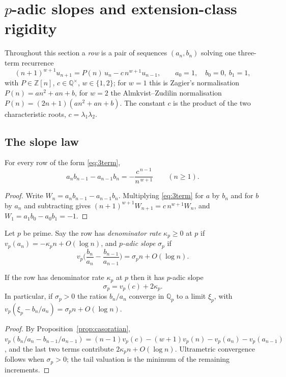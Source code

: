 \section{$p$-adic slopes and extension-class rigidity}\label{sec:padic}

Throughout this section a \emph{row} is a pair of sequences $(a_n,b_n)$ solving one three-term recurrence
\begin{equation}\label{eq:3term}
(n+1)^{w+1}u_{n+1}=P(n)\,u_n-c\,n^{w+1}u_{n-1},\qquad a_0=1,\quad b_0=0,\ b_1=1,
\end{equation}
with $P\in\mathbb Z[n]$, $c\in\mathbb Q^\times$, $w\in\{1,2\}$; for $w=1$ this is Zagier's normalisation $P(n)=an^2+an+b$, for $w=2$ the Almkvist--Zudilin normalisation $P(n)=(2n+1)(an^2+an+b)$. The constant $c$ is the product of the two characteristic roots, $c=\lambda_1\lambda_2$.

\subsection{The slope law}

\begin{proposition}[Casoratian]\label{prop:casoratian}
For every row of the form \eqref{eq:3term},
\[
a_nb_{n-1}-a_{n-1}b_n=-\frac{c^{\,n-1}}{n^{\,w+1}}\qquad(n\ge1).
\]
\end{proposition}
\begin{proof}
Write $W_n=a_nb_{n-1}-a_{n-1}b_n$. Multiplying \eqref{eq:3term} for $a$ by $b_n$ and for $b$ by $a_n$ and subtracting gives $(n+1)^{w+1}W_{n+1}=c\,n^{w+1}W_n$, and $W_1=a_1b_0-a_0b_1=-1$.
\end{proof}

\begin{definition}
Let $p$ be prime. Say the row has \emph{denominator rate} $\kappa_p\ge0$ at $p$ if $v_p(a_n)=-\kappa_pn+O(\log n)$, and \emph{$p$-adic slope} $\sigma_p$ if
\[
v_p\Big(\frac{b_n}{a_n}-\frac{b_{n-1}}{a_{n-1}}\Big)=\sigma_pn+O(\log n).
\]
\end{definition}

\begin{namedprop}\label{prop:C}
\Proved{} If the row has denominator rate $\kappa_p$ at $p$ then it has $p$-adic slope
\[
\sigma_p=v_p(c)+2\kappa_p .
\]
In particular, if $\sigma_p>0$ the ratios $b_n/a_n$ converge in $\mathbb Q_p$ to a limit $\xi_p$, with $v_p(\xi_p-b_n/a_n)=\sigma_pn+O(\log n)$.
\end{namedprop}
\begin{proof}
By Proposition~\ref{prop:casoratian},
$v_p(b_n/a_n-b_{n-1}/a_{n-1})=(n-1)v_p(c)-(w+1)v_p(n)-v_p(a_n)-v_p(a_{n-1})$, and the last two terms contribute $2\kappa_pn+O(\log n)$. Ultrametric convergence follows when $\sigma_p>0$; the tail valuation is the minimum of the remaining increments.
\end{proof}

